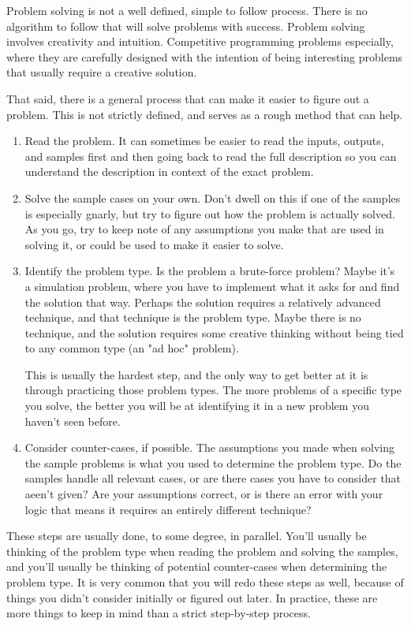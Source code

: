Problem solving is not a well defined, simple to follow process. There is no algorithm to follow that will solve problems with success. Problem solving involves creativity and intuition. Competitive programming problems especially, where they are carefully designed with the intention of being interesting problems that usually require a creative solution.

That said, there is a general process that can make it easier to figure out a problem. This is not strictly defined, and serves as a rough method that can help.

\begin{enumerate}
\item Read the problem. It can sometimes be easier to read the inputs, outputs, and samples first and then going back to read the full description so you can understand the description in context of the exact problem.
\item Solve the sample cases on your own. Don't dwell on this if one of the samples is especially gnarly, but try to figure out how the problem is actually solved. As you go, try to keep note of any assumptions you make that are used in solving it, or could be used to make it easier to solve.
\item Identify the problem type. Is the problem a brute-force problem? Maybe it's a simulation problem, where you have to implement what it asks for and find the solution that way. Perhaps the solution requires a relatively advanced technique, and that technique is the problem type. Maybe there is no technique, and the solution requires some creative thinking without being tied to any common type (an "ad hoc" problem).

This is usually the hardest step, and the only way to get better at it is through practicing those problem types. The more problems of a specific type you solve, the better you will be at identifying it in a new problem you haven't seen before.
\item Consider counter-cases, if possible. The assumptions you made when solving the sample problems is what you used to determine the problem type. Do the samples handle all relevant cases, or are there cases you have to consider that aeen't given? Are your assumptions correct, or is there an error with your logic that means it requires an entirely different technique?
\end{enumerate}

These steps are usually done, to some degree, in parallel. You'll usually be thinking of the problem type when reading the problem and solving the samples, and you'll usually be thinking of potential counter-cases when determining the problem type. It is very common that you will redo these steps as well, because of things you didn't consider initially or figured out later. In practice, these are more things to keep in mind than a strict step-by-step process.


